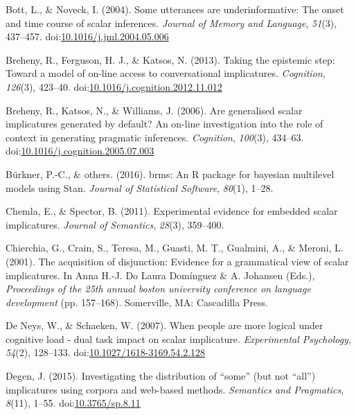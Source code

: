 \documentclass[man]{apa6}
\theoremstyle{definition}
\theoremstyle{definition}
\theoremstyle{definition}
\theoremstyle{remark}
\begin{document}
\hypertarget{ref-Bott2004}{}
Bott, L., \& Noveck, I. (2004). Some utterances are underinformative:
The onset and time course of scalar inferences. \emph{Journal of Memory
and Language}, \emph{51}(3), 437--457.
doi:\href{https://doi.org/10.1016/j.jml.2004.05.006}{10.1016/j.jml.2004.05.006}

\hypertarget{ref-Breheny2013}{}
Breheny, R., Ferguson, H. J., \& Katsos, N. (2013). Taking the epistemic
step: Toward a model of on-line access to conversational implicatures.
\emph{Cognition}, \emph{126}(3), 423--40.
doi:\href{https://doi.org/10.1016/j.cognition.2012.11.012}{10.1016/j.cognition.2012.11.012}

\hypertarget{ref-Breheny2006}{}
Breheny, R., Katsos, N., \& Williams, J. (2006). Are generalised scalar
implicatures generated by default? An on-line investigation into the
role of context in generating pragmatic inferences. \emph{Cognition},
\emph{100}(3), 434--63.
doi:\href{https://doi.org/10.1016/j.cognition.2005.07.003}{10.1016/j.cognition.2005.07.003}

\hypertarget{ref-burkner2016brms}{}
Bürkner, P.-C., \& others. (2016). brms: An R package for bayesian
multilevel models using Stan. \emph{Journal of Statistical Software},
\emph{80}(1), 1--28.

\hypertarget{ref-Chemla2011}{}
Chemla, E., \& Spector, B. (2011). Experimental evidence for embedded
scalar implicatures. \emph{Journal of Semantics}, \emph{28}(3),
359--400.

\hypertarget{ref-chierchia2001}{}
Chierchia, G., Crain, S., Teresa, M., Guasti, M. T., Gualmini, A., \&
Meroni, L. (2001). The acquisition of disjunction: Evidence for a
grammatical view of scalar implicatures. In Anna H.-J. Do Laura
Domínguez \& A. Johansen (Eds.), \emph{Proceedings of the 25th annual
boston university conference on language development} (pp. 157--168).
Somerville, MA: Cascadilla Press.

\hypertarget{ref-DeNeys2007}{}
De Neys, W., \& Schaeken, W. (2007). When people are more logical under
cognitive load - dual task impact on scalar implicature.
\emph{Experimental Psychology}, \emph{54}(2), 128--133.
doi:\href{https://doi.org/10.1027/1618-3169.54.2.128}{10.1027/1618-3169.54.2.128}

\hypertarget{ref-Degen2015}{}
Degen, J. (2015). Investigating the distribution of ``some'' (but not
``all'') implicatures using corpora and web-based methods.
\emph{Semantics and Pragmatics}, \emph{8}(11), 1--55.
doi:\href{https://doi.org/10.3765/sp.8.11}{10.3765/sp.8.11}
\end{document}
